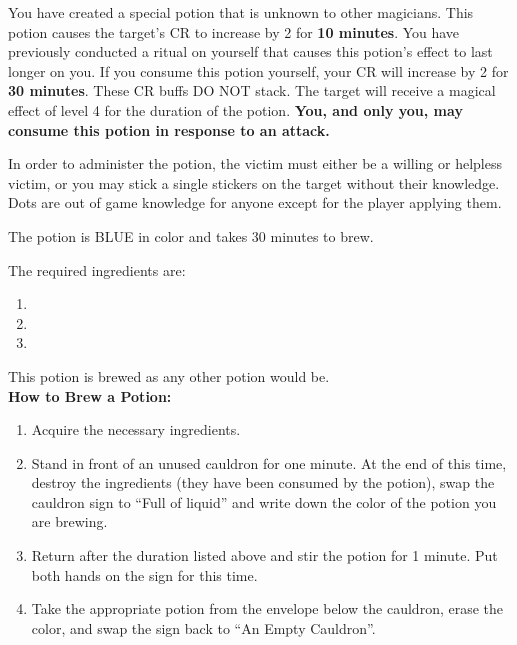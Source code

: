 \documentclass[green]{NeptuneBall}
\begin{document}
\name{\gBuff{}}

You have created a special potion that is unknown to other magicians. This potion causes the target's CR to increase by 2 for {\bf 10 minutes}.  You have previously conducted a ritual on yourself that causes this potion's effect to last longer on you. If you consume this potion yourself, your CR will increase by 2 for {\bf 30 minutes}. These CR buffs DO NOT stack. The target will receive a magical effect of level 4 for the duration of the potion. {\bf You, and only you, may consume this potion in response to an attack.}

In order to administer the potion, the victim must either be a willing or helpless victim, or you may stick a single stickers on the target without their knowledge. Dots are out of game knowledge for anyone except for the player applying them.

The potion is BLUE in color and takes 30 minutes to brew. 

The required ingredients are:
\begin{enumerate}
\item \iManOfWar{}
\item \iTeeth{}
\item \iSwordfish{}
\end{enumerate}

This potion is brewed as any other potion would be.\\

{\bf How to Brew a Potion:}\\ %
\begin{enumerate}
  \item Acquire the necessary ingredients.
  \item Stand in front of an unused cauldron for one minute. At the end of this time, destroy the ingredients (they have been consumed by the potion), swap the cauldron sign to ``Full of liquid'' and write down the color of the potion you are brewing.
  \item Return after the duration listed above and stir the potion for 1 minute. Put both hands on the sign for this time.
  \item Take the appropriate potion from the envelope below the cauldron, erase the color, and swap the sign back to ``An Empty Cauldron''.
\end{enumerate}
\end{document}
